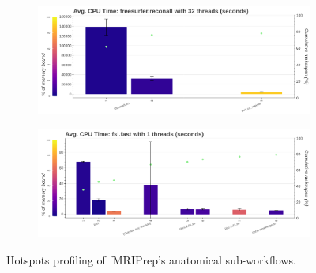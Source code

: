\documentclass[conference]{IEEEtran}
\begin{document}
\begin{figure}[ht!]
	\begin{subfigure}[t]{0.49\textwidth}
		\caption{}
		\label{subfig:hotspots-32threads-freesurfer-reconall}
		\includegraphics[width=\textwidth]{figures/hotspots-32threads-freesurfer-reconall.png}
	\end{subfigure}
	\hfill
	\begin{subfigure}[t]{0.49\textwidth}
		\caption{}
		\label{subfig:hotspots-fsl-fast}
		\includegraphics[width=\textwidth]{figures/hotspots-1thread-fsl-fast.png}
	\end{subfigure}
																																																																			
	\caption{Hotspots profiling of fMRIPrep's anatomical sub-workflows.}
	\label{fig:hotspots-fmriprep-anat-subworkflow}
\end{figure}
\end{document}
